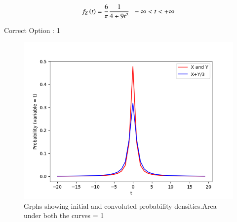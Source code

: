 \documentclass[journal,12pt,twocolumn]{IEEEtran}
\begin{document}
\begin{align}
    f_{Z}\left(t\right) = \frac{6}{\pi} \displaystyle\frac{1}{4 + 9{t}^2}\hspace{0.2cm}-\infty < t < +\infty
\end{align}
\begin{center}
    Correct Option : 1
\end{center}
\begin{figure}[H]
    \includegraphics[width = \columnwidth]{Assignment-8.png}
    \caption{Grphs showing initial and convoluted probability densities.Area under both the curves = 1}
\end{figure}
\end{document}
